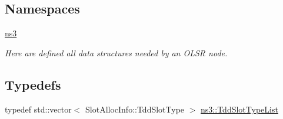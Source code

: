 \subsection*{Namespaces}
\begin{DoxyCompactItemize}
\item 
 \hyperlink{namespacens3}{ns3}
\begin{DoxyCompactList}\small\item\em Here are defined all data structures needed by an O\+L\+SR node. \end{DoxyCompactList}\end{DoxyCompactItemize}
\subsection*{Typedefs}
\begin{DoxyCompactItemize}
\item 
typedef std\+::vector$<$ Slot\+Alloc\+Info\+::\+Tdd\+Slot\+Type $>$ \hyperlink{namespacens3_a74052c5410c5c8e0028017dbf985cd1f}{ns3\+::\+Tdd\+Slot\+Type\+List}
\end{DoxyCompactItemize}
